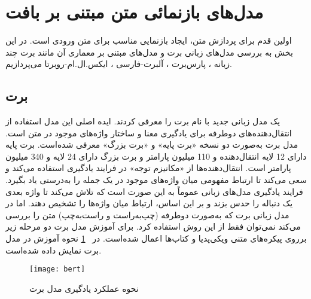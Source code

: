 
\section{مدل‌های بازنمائی متن مبتنی بر بافت}
اولین قدم برای پردازش متن، ایجاد بازنمایی مناسب برای متن ورودی است. در این بخش به بررسی مدل‌های زبانی برت \citep{devlin2018bert} و مدل‌های مبتنی بر معماری آن مانند برت چند زبانه ، پارس‌برت  \citep{ParsBERT}، آلبرت‌-فارسی  \citep{ALBERTPersian}، ایکس.ال.ام-روبرتا  \citep{conneau2019unsupervised} می‌پردازیم.

\subsection{برت}
\label{section.bert}
\citet{devlin2018bert} 
یک مدل زبانی جدید با نام برت را معرفی کردند. ایده اصلی این مدل استفاده از انتقال‌دهنده‌های‌ دوطرفه برای یادگیری معنا و ساختار واژه‌های موجود در متن است. مدل برت به‌صورت دو نسخه «برت پایه» و «برت بزرگ» معرفی شده‌است. برت پایه دارای 12 لایه انتقال‌دهنده و  110 میلیون پارامتر و برت بزرگ دارای  24 لایه و 340 میلیون پارامتر است. انتقال‌دهنده‌ها از «مکانیزم توجه» در فرایند یادگیری استفاده می‌کند و سعی می‌کند تا ارتباط مفهومی میان واژه‌های موجود در یک جمله را به‌درستی یاد بگیرد. فرایند یادگیری مدل‌های زبانی عموماً به این صورت است که تلاش می‌کند تا واژه بعدی یک دنباله را حدس بزند و بر این اساس، ارتباط میان واژه‌ها را تشخیص دهند. اما در مدل زبانی برت که به‌صورت دوطرفه (چپ‌به‌راست و راست‌به‌چپ) متن را بررسی می‌کند نمی‌توان فقط از این روش استفاده کرد. برای آموزش مدل برت دو مرحله زیر برروی پیکره‌های متنی ویکی‌پدیا و کتاب‌ها اعمال شده‌است. 
 در \figurename~\ref{fig.BERT} نحوه آموزش در مدل برت نمایش داده شده‌است.

\begin{figure}[!h]
\texttt{[image: bert]}
\centering
\caption{ نحوه عملکرد یادگیری مدل برت \citep{devlin2018bert}}
\label{fig.BERT}
\end{figure}

